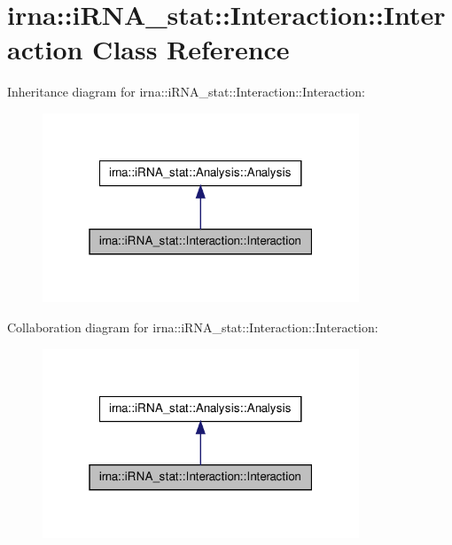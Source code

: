\hypertarget{classirna_1_1iRNA__stat_1_1Interaction_1_1Interaction}{
\section{irna\-:\-:i\-R\-N\-A\-\_\-stat\-:\-:\-Interaction\-:\-:\-Interaction \-Class \-Reference}
\label{classirna_1_1iRNA__stat_1_1Interaction_1_1Interaction}
}


\-Inheritance diagram for irna\-:\-:i\-R\-N\-A\-\_\-stat\-:\-:\-Interaction\-:\-:\-Interaction\-:\nopagebreak
\begin{figure}[H]
\begin{center}
\leavevmode
\includegraphics[width=268pt]{classirna_1_1iRNA__stat_1_1Interaction_1_1Interaction__inherit__graph}
\end{center}
\end{figure}


\-Collaboration diagram for irna\-:\-:i\-R\-N\-A\-\_\-stat\-:\-:\-Interaction\-:\-:\-Interaction\-:\nopagebreak
\begin{figure}[H]
\begin{center}
\leavevmode
\includegraphics[width=268pt]{classirna_1_1iRNA__stat_1_1Interaction_1_1Interaction__coll__graph}
\end{center}
\end{figure}

